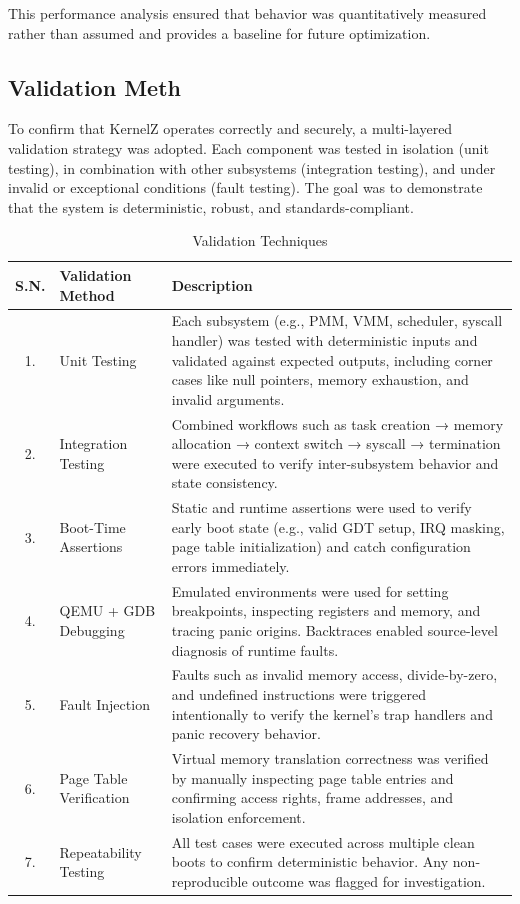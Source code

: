 \documentclass[12pt]{extarticle}
\begin{document}
This performance analysis ensured that behavior was quantitatively measured rather than assumed and provides a baseline for future optimization.

\subsection{Validation Meth}

To confirm that KernelZ operates correctly and securely, a multi-layered validation strategy was adopted. Each component was tested in isolation (unit testing), in combination with other subsystems (integration testing), and under invalid or exceptional conditions (fault testing). The goal was to demonstrate that the system is deterministic, robust, and standards-compliant.

\begin{table}[H]
    \renewcommand{\arraystretch}{1.5}
    \centering
    \begin{tabular}{|c|p{3.8cm}|p{9.8cm}|}
        \hline
        \textbf{S.N.} & \textbf{Validation Method} & \textbf{Description} \\
        \hline
        1. & Unit Testing & Each subsystem (e.g., PMM, VMM, scheduler, syscall handler) was tested with deterministic inputs and validated against expected outputs, including corner cases like null pointers, memory exhaustion, and invalid arguments. \\
        \hline
        2. & Integration Testing & Combined workflows such as task creation → memory allocation → context switch → syscall → termination were executed to verify inter-subsystem behavior and state consistency. \\
        \hline
        3. & Boot-Time Assertions & Static and runtime assertions were used to verify early boot state (e.g., valid GDT setup, IRQ masking, page table initialization) and catch configuration errors immediately. \\
        \hline
        4. & QEMU + GDB Debugging & Emulated environments were used for setting breakpoints, inspecting registers and memory, and tracing panic origins. Backtraces enabled source-level diagnosis of runtime faults. \\
        \hline
        5. & Fault Injection & Faults such as invalid memory access, divide-by-zero, and undefined instructions were triggered intentionally to verify the kernel's trap handlers and panic recovery behavior. \\
        \hline
        6. & Page Table Verification & Virtual memory translation correctness was verified by manually inspecting page table entries and confirming access rights, frame addresses, and isolation enforcement. \\
        \hline
        7. & Repeatability Testing & All test cases were executed across multiple clean boots to confirm deterministic behavior. Any non-reproducible outcome was flagged for investigation. \\
        \hline
    \end{tabular}
    \caption{Validation Techniques}
    \label{tab:validation_scheme}
\end{table}
\end{document}

